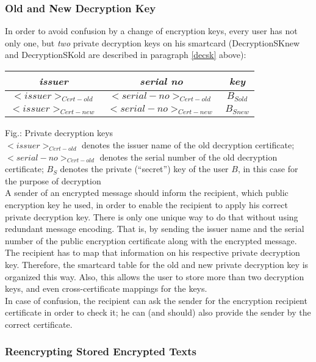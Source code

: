 \subsubsection{Old and New Decryption Key}
\label{ope-ondk}

In order to avoid confusion by a change of encryption keys,
every user has not only one, but {\em two}
private decryption keys on his smartcard
(DecryptionSKnew and DecryptionSKold are described
in paragraph \ref{decsk} above):

\begin {center}
\begin {tabular}{|c|c|c|}
\hline
{\em issuer} & {\em serial no}& {\em key} \\ \hline
$<issuer>_{Cert-old}$ & $<serial-no>_{Cert-old}$ & $B_{Sold}$    \\ \hline
$<issuer>_{Cert-new}$ & $<serial-no>_{Cert-new}$ & $B_{Snew}$    \\ \hline
\end {tabular}
\end {center}
 
\label{fig-ope-ondk}
{\footnotesize Fig.: Private decryption keys}
\\
{\footnotesize $<issuer>_{Cert-old}$ denotes the issuer name of the
old decryption certificate;
$<serial-no>_{Cert-old}$ denotes the serial number of the
old decryption certificate;
$B_S$ denotes the private (``secret'') key
of the user $B$, in this case for the purpose of decryption}
\\[1em]
A sender of an encrypted message should inform the recipient,
which public encryption key he used,
in order to enable the recipient to apply his correct private decryption key.
There is only one unique way to do that without using redundant
message encoding.
That is, by sending the issuer name and the serial number
of the public encryption certificate along with the encrypted message.
The recipient has to map that information on his respective private
decryption key.
Therefore, the smartcard table for the old and
new private decryption key is organized this way.
Also, this allows the user to store more than two decryption keys,
and even cross-certificate mappings for the keys.
\\
In case of confusion, the recipient can ask the sender
for the encryption recipient certificate in order to check it;
he can (and should) also provide the sender by the correct certificate.

\subsubsection{Reencrypting Stored Encrypted Texts}
\label{ope-set}

